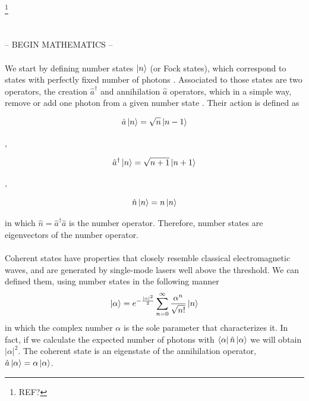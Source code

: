 \footnote{REF?}
\\
\\
\\
-- BEGIN MATHEMATICS --\\
\\
We start by defining number states $\ket{n}$ (or Fock states), which correspond to states with perfectly fixed number of photons
\cite{loudon2000}.
Associated to those states are two operators, the creation $\hat{a}^\dagger$ and annihilation $\hat{a}$ operators, which in a simple way, remove or add one photon from a given number state
\cite{fox2006}.
Their action is defined as
%
\begin{center}
	\hspace{-4mm}
	\begin{minipage}{44mm}
		\noindent
		\begin{equation}
			\hat{a} \ket{n} = \sqrt{n} \ket{n-1}
		\end{equation}
	\end{minipage}
	$,\quad$
	\begin{minipage}{52mm}
		\noindent
		\begin{equation}
			\hat{a}^\dagger \ket{n} = \sqrt{n+1} \ket{n+1}
		\end{equation}
	\end{minipage}
	$,\quad$
	\begin{minipage}{35mm}
		\noindent
		\begin{equation}
			\hat{n} \ket{n} = n \ket{n}
		\end{equation}
	\end{minipage}
\end{center}
%
in which $\hat{n} = \hat{a}^\dagger\hat{a}$ is the number operator. Therefore, number states are eigenvectors of the number operator.\\
\\
Coherent states have properties that closely resemble classical electromagnetic waves, and are generated by single-mode lasers well above the threshold.
\cite{loudon2000}
We can defined them, using number states in the following manner
\begin{equation}
\ket{\alpha} = e^{-\frac{|\alpha|^2}{2}} \sum_{n=0}^\infty \frac{\alpha^n}{\sqrt{n!}} \ket{n}
\end{equation}
in which the complex number $\alpha$ is the sole parameter that characterizes it.
In fact, if we calculate the expected number of photons with $\bra{\alpha} \hat{n} \ket{\alpha}$ we will obtain $|\alpha|^2$. The coherent state is an eigenstate of the annihilation operator, $\hat{a}\ket{\alpha} = \alpha \ket{\alpha}$.\\
